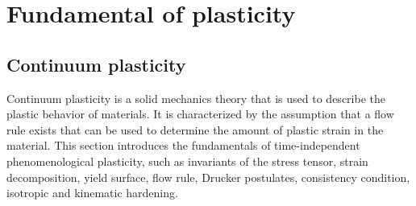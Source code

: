 \chapter{Fundamental of plasticity}


\graphicspath{{Chapter2/Chapter2Figs/PDF/}{Chapter2/Chapter2Figs/}}




\section{Continuum plasticity}
Continuum plasticity is a solid mechanics theory that is used to describe the plastic behavior of materials.
It is characterized by the assumption that a flow rule exists that can be used to determine the amount of plastic strain in the material.
This section introduces the fundamentals of time-independent phenomenological plasticity, such as invariants of the stress tensor, strain decomposition, yield surface, flow rule, Drucker postulates, consistency condition, isotropic and kinematic hardening.

